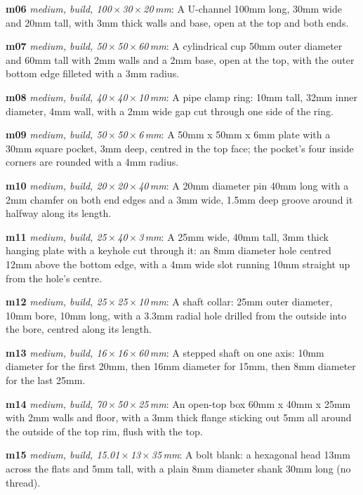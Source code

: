 {\noindent\textbf{m06} \emph{medium, build, 100\,$\times$\,30\,$\times$\,20\,mm}: A U-channel 100mm long, 30mm wide and 20mm tall, with 3mm thick walls and base, open at the top and both ends.\par
\noindent\textbf{m07} \emph{medium, build, 50\,$\times$\,50\,$\times$\,60\,mm}: A cylindrical cup 50mm outer diameter and 60mm tall with 2mm walls and a 2mm base, open at the top, with the outer bottom edge filleted with a 3mm radius.\par
\noindent\textbf{m08} \emph{medium, build, 40\,$\times$\,40\,$\times$\,10\,mm}: A pipe clamp ring: 10mm tall, 32mm inner diameter, 4mm wall, with a 2mm wide gap cut through one side of the ring.\par
\noindent\textbf{m09} \emph{medium, build, 50\,$\times$\,50\,$\times$\,6\,mm}: A 50mm x 50mm x 6mm plate with a 30mm square pocket, 3mm deep, centred in the top face; the pocket's four inside corners are rounded with a 4mm radius.\par
\noindent\textbf{m10} \emph{medium, build, 20\,$\times$\,20\,$\times$\,40\,mm}: A 20mm diameter pin 40mm long with a 2mm chamfer on both end edges and a 3mm wide, 1.5mm deep groove around it halfway along its length.\par
\noindent\textbf{m11} \emph{medium, build, 25\,$\times$\,40\,$\times$\,3\,mm}: A 25mm wide, 40mm tall, 3mm thick hanging plate with a keyhole cut through it: an 8mm diameter hole centred 12mm above the bottom edge, with a 4mm wide slot running 10mm straight up from the hole's centre.\par
\noindent\textbf{m12} \emph{medium, build, 25\,$\times$\,25\,$\times$\,10\,mm}: A shaft collar: 25mm outer diameter, 10mm bore, 10mm long, with a 3.3mm radial hole drilled from the outside into the bore, centred along its length.\par
\noindent\textbf{m13} \emph{medium, build, 16\,$\times$\,16\,$\times$\,60\,mm}: A stepped shaft on one axis: 10mm diameter for the first 20mm, then 16mm diameter for 15mm, then 8mm diameter for the last 25mm.\par
\noindent\textbf{m14} \emph{medium, build, 70\,$\times$\,50\,$\times$\,25\,mm}: An open-top box 60mm x 40mm x 25mm with 2mm walls and floor, with a 3mm thick flange sticking out 5mm all around the outside of the top rim, flush with the top.\par
\noindent\textbf{m15} \emph{medium, build, 15.01\,$\times$\,13\,$\times$\,35\,mm}: A bolt blank: a hexagonal head 13mm across the flats and 5mm tall, with a plain 8mm diameter shank 30mm long (no thread).\par
}
